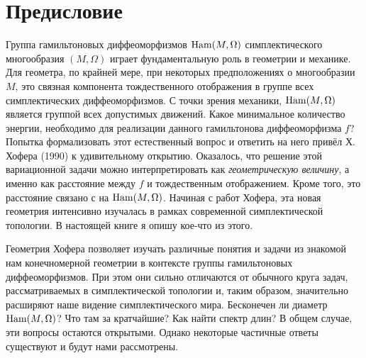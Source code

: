 \chapter*{Предисловие}

Группа гамильтоновых диффеоморфизмов $\mathrm{Ham}(M,\Omega)$ симплектического многообразия $(M,\Omega)$ играет фундаментальную роль  в геометрии и механике.
Для геометра, по крайней мере, при некоторых предположениях о многообразии $M$, это связная компонента тождественного отображения в группе всех симплектических диффеоморфизмов.
С точки зрения механики, $\mathrm{Ham}(M,\Omega)$ является группой всех допустимых движений.
Какое минимальное количество энергии, необходимо для реализации данного гамильтонова диффеоморфизма $f$?
Попытка формализовать этот естественный вопрос и ответить на него привёл Х. Хофера \cite{H1} (1990) к удивительному открытию.
Оказалось, что решение этой вариационной задачи можно интерпретировать как \emph{геометрическую величину}, а именно как расстояние между $f$ и тождественным отображением.
Кроме того, это расстояние связано с  на $\mathrm{Ham}(M,\Omega)$. 
Начиная с работ Хофера, эта новая геометрия интенсивно изучалась в рамках современной симплектической топологии.
В настоящей книге я опишу кое-что из этого.

Геометрия Хофера позволяет изучать различные понятия и задачи из знакомой нам конечномерной геометрии в контексте группы гамильтоновых диффеоморфизмов.
При этом они сильно отличаются от обычного круга задач, рассматриваемых в симплектической топологии и, таким образом, значительно расширяют наше видение симплектического мира.
Бесконечен ли диаметр $\mathrm{Ham}(M,\Omega)$?
Что там за кратчайшие?
Как найти спектр длин?
В общем случае, эти вопросы остаются открытыми.
Однако некоторые частичные ответы существуют и будут нами рассмотрены.

